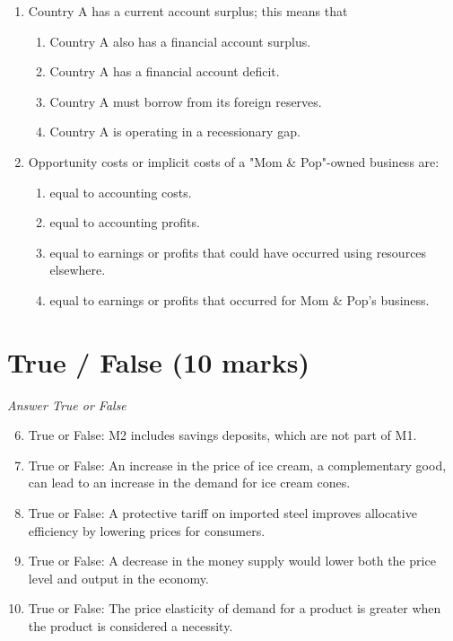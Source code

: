 \documentclass[12pt]{article}
\begin{document}
\begin{enumerate}[label=\arabic*.]
\item Country A has a current account surplus; this means that
\begin{enumerate}[label=(\alph*)]
    \item Country A also has a financial account surplus.
    \item Country A has a financial account deficit.
    \item Country A must borrow from its foreign reserves.
    \item Country A is operating in a recessionary gap.
\end{enumerate}
\item Opportunity costs or implicit costs of a "Mom \& Pop"-owned business are:
\begin{enumerate}[label=(\alph*)]
    \item equal to accounting costs.
    \item equal to accounting profits.
    \item equal to earnings or profits that could have occurred using resources elsewhere.
    \item equal to earnings or profits that occurred for Mom \& Pop's business.
\end{enumerate}
\end{enumerate}

\section*{True / False (10 marks)}
\textit{Answer True or False}
\begin{enumerate}[label=\arabic*.]
\setcounter{enumi}{5}
\item True or False: M2 includes savings deposits, which are not part of M1.
\item True or False: An increase in the price of ice cream, a complementary good, can lead to an increase in the demand for ice cream cones.
\item True or False: A protective tariff on imported steel improves allocative efficiency by lowering prices for consumers.
\item True or False: A decrease in the money supply would lower both the price level and output in the economy.
\item True or False: The price elasticity of demand for a product is greater when the product is considered a necessity.
\end{enumerate}
\end{document}
